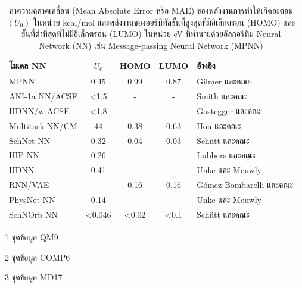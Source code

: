 \begin{table}[H]
\begin{threeparttable}[b]
    \centering
    \caption{ค่าความคลาดเคลื่อน (Mean Absolute Error หรือ MAE) ของพลังงานการทำให้เกิดอะตอม $(U_{0})$ ในหน่วย kcal/mol และพลังงานของออร์บิทัลชั้นที่สูงสุดที่มีอิเล็กตรอน (HOMO) และชั้นที่ต่ำที่สุดที่ไม่มีอิเล็กตรอน (LUMO) ในหน่วย eV ที่ทำนายด้วยอัลกอริทึม Neural Network (NN) เช่น Message-passing Neural Network (MPNN)}
    \label{tab:pred_ener_atom_orb_nn}
    \begin{tabular}{lcccl}
        \toprule
        \textbf{โมเดล NN}        & \textbf{$U_{0}$} & HOMO  & LUMO & \textbf{อ้างอิง}                                             \\
        \midrule
        MPNN\tnote{1}            & 0.45             & 0.99  & 0.87 & Gilmer และคณะ\autocite{gilmer2017}                         \\
        ANI-1a NN/ACSF\tnote{2}  & <1.5             & -     & -    & Smith และคณะ\autocite{smith2017,smith2018,smith2019}       \\
        HDNN/w-ACSF\tnote{1}     & <1.8             & -     & -    & Gastegger และคณะ\autocite{gastegger2018}                   \\
        Multitask NN/CM\tnote{1} & 44               & 0.38  & 0.63 & Hou และคณะ\autocite{hou2018}                               \\
        SchNet NN\tnote{1}       & 0.32             & 0.04  & 0.03 & Schütt และคณะ\autocite{schutt2018}                         \\
        HIP-NN\tnote{1}          & 0.26             & -     & -    & Lubbers และคณะ\autocite{lubbers2018}                       \\
        HDNN\tnote{1}            & 0.41             & -     & -    & Unke และ Meuwly\autocite{unke2018}                         \\
        RNN/VAE\tnote{1}         & -                & 0.16  & 0.16 & G\'{o}mez-Bombarelli และคณะ\autocite{gomez-bombarelli2018} \\
        PhysNet NN\tnote{1}      & 0.14             & -     & -    & Unke และ Meuwly\autocite{unke2019}                         \\
        SchNOrb NN\tnote{3}      & <0.046           & <0.02 & <0.1 & Sch\"{u}tt และคณะ\autocite{schutt2019a}                    \\
        \bottomrule
    \end{tabular}
    \begin{tablenotes}
        \item [1]ชุดข้อมูล QM9
        \item [2]ชุดข้อมูล COMP6
        \item [3]ชุดข้อมูล MD17
    \end{tablenotes}
\end{threeparttable}
\end{table}

